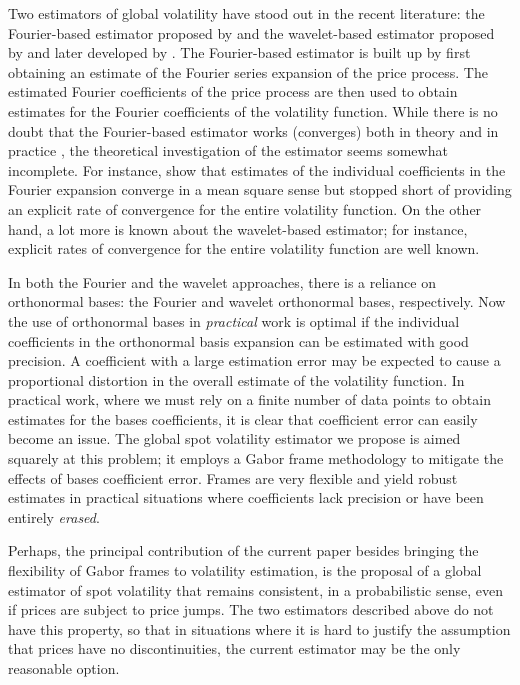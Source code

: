 \documentclass[a4paper, 12pt]{article}
\begin{document}
Two estimators  of global volatility have stood out in the recent literature: the Fourier-based estimator proposed by \cite{Malliavin2002} and the wavelet-based estimator proposed by \cite{GenonCatalot1992} and later developed by \cite{Hoffmann2012}. The Fourier-based  estimator is built up  by first obtaining an estimate of  the Fourier series expansion  of the price process. The estimated Fourier coefficients of the price process are then used to obtain estimates for the Fourier coefficients of the volatility function. While there is no doubt that the Fourier-based estimator works (converges) both in theory and in practice \citep[See][]{Malliavin2007,Malliavin2009}, the theoretical investigation of the estimator seems somewhat incomplete.
For instance, \citeauthor{Malliavin2002} show that estimates of the individual coefficients  in the Fourier expansion converge in a mean square sense but  stopped short of providing an explicit rate of convergence for the entire volatility function. On the other hand,  a lot more is known about the wavelet-based estimator; for instance, explicit rates of convergence for the entire volatility function are  well known.  

In both the Fourier and the wavelet approaches, there is a reliance  on orthonormal bases: the Fourier and wavelet orthonormal bases, respectively.   Now the use of orthonormal bases  in \emph{practical} work is optimal  if  the  individual coefficients in the orthonormal basis expansion can be estimated with good precision. A coefficient with a large estimation error may be expected to cause a proportional distortion in the overall estimate of the volatility function. In practical work, where  we must rely on a finite  number of data points to obtain estimates for the bases coefficients, it is  clear that coefficient error can easily become an issue. The global spot volatility estimator we propose  is aimed squarely at this problem; it  employs a Gabor frame methodology to mitigate the effects of bases coefficient error. Frames are very flexible and yield robust estimates in practical situations where coefficients lack  precision or have been entirely \emph{erased}.  

Perhaps, the principal contribution of the current paper besides bringing the flexibility of Gabor frames to volatility estimation, is the proposal of a global estimator of spot volatility that remains consistent, in a probabilistic sense,  even if prices are subject to price jumps. The two estimators described above do not have this property, so that in situations where it is hard to justify the assumption that prices have no discontinuities,   the current estimator may be the only reasonable option.  
\end{document}
